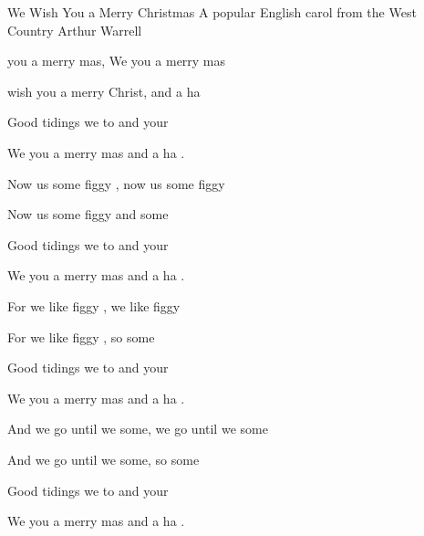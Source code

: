 \begin{SBSong}{We Wish You a Merry Christmas}
  {A popular English carol from the West Country}
  {Arthur Warrell}
  \begin{SBVerse}
      you a merry mas, We  you a merry mas
    
     wish you a merry Christ, and a ha  
    
     Good tidings we  to  and your 
    
     We  you a merry mas and a ha  .
  \end{SBVerse}
  \begin{SBVerse}
    Now  us some figgy , now  us some figgy 

    Now  us some figgy  and  some  

    Good tidings we  to  and your 

    We  you a merry mas and a ha  .
  \end{SBVerse}
  \begin{SBVerse}
    For we  like figgy ,  we  like figgy 

    For we  like figgy , so  some  

    Good tidings we  to  and your 

    We  you a merry mas and a ha  .
  \end{SBVerse}
  \begin{SBVerse}
    And we  go until we  some,  we  go until we  some

    And we  go until we  some, so  some  

    Good tidings we  to  and your 


    We  you a merry mas and a ha  . 
  \end{SBVerse}
\end {SBSong}
  
